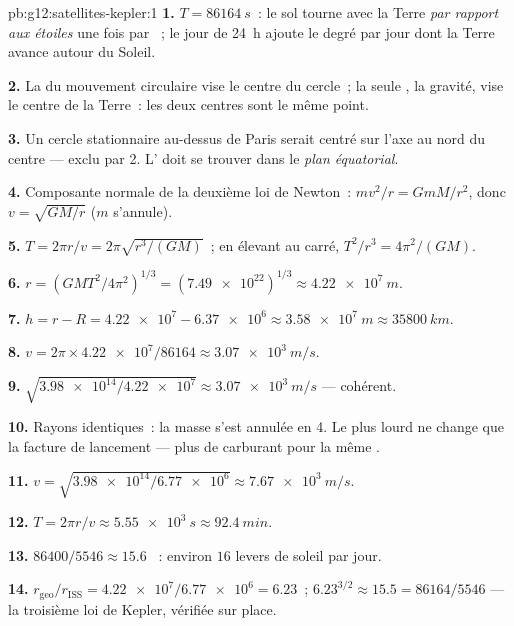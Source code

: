 \begin{solution}{pb:g12:satellites-kepler:1}
\textbf{1.} $T = \qty{86164}{s}$~: le sol tourne avec la Terre
\emph{par rapport aux étoiles} une fois par ~; le
jour de \qty{24}{h} ajoute le degré par jour dont la Terre avance
autour du Soleil.

\textbf{2.} La  du mouvement circulaire vise le
centre du cercle~; la seule , la gravité, vise le
centre de la Terre~: les deux centres sont le même point.

\textbf{3.} Un cercle stationnaire au-dessus de Paris serait centré sur
l'axe au nord du centre --- exclu par 2. L'
doit se trouver dans le \emph{plan équatorial}.

\textbf{4.} Composante normale de la deuxième loi de Newton~:
$m v^2/r = GmM/r^2$, donc $v = \sqrt{GM/r}$ ($m$ s'annule).

\textbf{5.} $T = 2\pi r/v = 2\pi\sqrt{r^3/(GM)}$~; en élevant au carré,
$T^2/r^3 = 4\pi^2/(GM)$.

\textbf{6.} $r = \left(GMT^2/4\pi^2\right)^{1/3} =
(\num{7.49e22})^{1/3} \approx \qty{4.22e7}{m}$.

\textbf{7.} $h = r - R = \num{4.22e7} - \num{6.37e6} \approx
\qty{3.58e7}{m} \approx \qty{35800}{km}$.

\textbf{8.} $v = 2\pi \times \num{4.22e7}/\num{86164} \approx
\qty{3.07e3}{m/s}$.

\textbf{9.} $\sqrt{\num{3.98e14}/\num{4.22e7}} \approx
\qty{3.07e3}{m/s}$ --- cohérent.

\textbf{10.} Rayons identiques~: la masse s'est annulée en 4. Le
 plus lourd ne change que la facture de
lancement --- plus de carburant pour la même
.

\textbf{11.} $v = \sqrt{\num{3.98e14}/\num{6.77e6}} \approx
\qty{7.67e3}{m/s}$.

\textbf{12.} $T = 2\pi r/v \approx \qty{5.55e3}{s} \approx
\qty{92.4}{min}$.

\textbf{13.} $\num{86400}/5546 \approx 15.6$ ~: environ
$16$ levers de soleil par jour.

\textbf{14.} $r_{\text{geo}}/r_{\text{ISS}} = \num{4.22e7}/\num{6.77e6}
= 6.23$~; $6.23^{3/2} \approx 15.5 = \num{86164}/5546$ --- la troisième
loi de Kepler, vérifiée sur place.


\end{solution}
